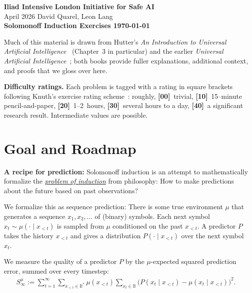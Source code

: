 \documentclass[fontsize=11pt, parskip=half]{scrartcl}
\theoremstyle{definition}
\newcommand{\mytitle}[1]{{\noindent\Large\textbf{#1}}}
\begin{document}
\noindent\textbf{Iliad Intensive} \hfill \textbf{London Initiative for Safe AI}\\
April 2026 \hfill David Quarel, Leon Lang\\

\mytitle{Solomonoff Induction Exercises \hfill \today}

\medskip
\noindent
Much of this material is drawn from Hutter's \emph{An Introduction to Universal Artificial Intelligence}~\cite{Hutter:24uaibook2} (Chapter~3 in particular) and the earlier \emph{Universal Artificial Intelligence}~\cite{Hutter:04uaibook}; both books provide fuller explanations, additional context, and proofs that we gloss over here.

\medskip
\noindent
\textbf{Difficulty ratings.} Each problem is tagged with a rating in square brackets following Knuth's exercise rating scheme~\cite{Knuth:73a}: roughly, \textbf{[00]}~trivial, \textbf{[10]}~15--minute pencil-and-paper, \textbf{[20]}~1--2~hours, \textbf{[30]}~several hours to a day, \textbf{[40]}~a significant research result. Intermediate values are possible.

\section*{Goal and Roadmap}

\textbf{A recipe for prediction:} Solomonoff induction is an attempt to mathematically
formalize the \href{https://en.wikipedia.org/wiki/Problem_of_induction}{\emph{problem of induction}}
from philosophy: How to make predictions about the future based on past observations?

We formalize this as sequence prediction: There is some true environment $\mu$ that generates
a sequence $x_1, x_2, \dots$ of (binary) symbols. Each next symbol $x_t \sim \mu(\cdot \mid x_{<t})$ is sampled
from $\mu$ conditioned on the past $x_{<t}$. A predictor $P$ takes the history $x_{<t}$ and gives a 
distribution $P(\cdot \mid x_{<t})$ over the next symbol $x_t$. 

We measure the quality of a predictor $P$ by the $\mu$-expected squared prediction error, summed over every timestep:
\begin{align}
S_\infty^\mu := \sum_{t=1}^{\infty} \sum_{x_{<t} \in \mathbb{B}^*} \mu(x_{<t}) \sum_{x_t \in \mathbb{B}} \big( P(x_t \mid x_{<t}) - \mu(x_t \mid x_{<t}) \big)^2.
\end{align}
\end{document}
